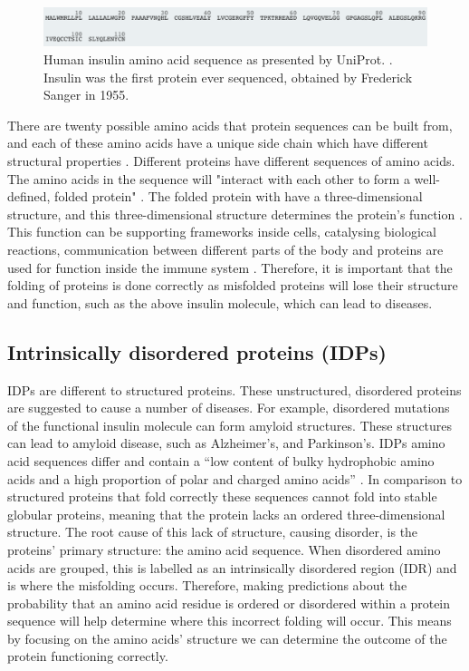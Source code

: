 \documentclass{l4proj}
\begin{document}
\begin{figure}[!h]
    \centering
    \includegraphics[width=\linewidth]{images/bgseq.pdf}

    \caption{Human insulin amino acid sequence as presented by UniProt. \citep{uniprot:22}. Insulin was the first protein ever sequenced, obtained by Frederick Sanger in 1955.}

    \label{fig:sequence example} 
\end{figure}

There are twenty possible amino acids that protein sequences can be built from, and each of these amino acids have a unique side chain which have different structural properties \citep{aa:wiki}. Different proteins have different sequences of amino acids. The amino acids in the sequence will "interact with each other to form a well-defined, folded protein" \citep{Cheriyedath:19}. The folded protein with have a three-dimensional structure, and this three-dimensional structure determines the protein's function \citep{bbc_bitesize}. This function can be supporting frameworks inside cells, catalysing biological reactions, communication between different parts of the body and proteins are used for function inside the immune system \citep{bbc_bitesize}. Therefore, it is important that the folding of proteins is done correctly as misfolded proteins will lose their structure and function, such as the above insulin molecule, which can lead to diseases.

\subsection{Intrinsically disordered proteins (IDPs)}
\label{chap:background sec:IDPs}

IDPs are different to structured proteins. These unstructured, disordered proteins are suggested to cause a number of diseases. For example, disordered mutations of the functional insulin molecule can form amyloid structures. These structures can lead to amyloid disease, such as Alzheimer's, and Parkinson's. IDPs amino acid sequences differ and contain a “low content of bulky hydrophobic amino acids and a high proportion of polar and charged amino acids” \citep{idp:wiki}. In comparison to structured proteins that fold correctly these sequences cannot fold into stable globular proteins, meaning that the protein lacks an ordered three-dimensional structure. The root cause of this lack of structure, causing disorder, is the proteins’ primary structure: the amino acid sequence. When disordered amino acids are grouped, this is labelled as an intrinsically disordered region (IDR) and is where the misfolding occurs. Therefore, making predictions about the probability that an amino acid residue is ordered or disordered within a protein sequence will help determine where this incorrect folding will occur. This means by focusing on the amino acids’ structure we can determine the outcome of the protein functioning correctly. 
\end{document}
